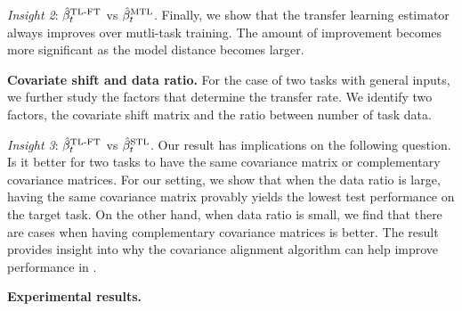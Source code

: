 	{\it Insight 2}: $\hat{\beta}_t^{\text{TL-FT}}$ vs $\hat{\beta}_t^{\text{MTL}}$.
	Finally, we show that the transfer learning estimator always improves over mutli-task training.
	The amount of improvement becomes more significant as the model distance becomes larger.



\smallskip
	\noindent\textbf{Covariate shift and data ratio.}
	For the case of two tasks with general inputs, we further study the factors that determine the transfer rate.
	We identify two factors, the covariate shift matrix and the ratio between number of task data.

	\textit{Insight 3}: $\hat{\beta}_t^{\text{TL-FT}}$ vs $\hat{\beta}_t^{\text{STL}}$.
	Our result has implications on the following question.
	Is it better for two tasks to have the same covariance matrix or complementary covariance matrices.
	For our setting, we show that when the data ratio is large, having the same covariance matrix provably yields the lowest test performance on the target task.
	On the other hand, when data ratio is small, we find that there are cases when having complementary covariance matrices is better.
	The result provides insight into why the covariance alignment algorithm can help improve performance in \cite{WZR20}.

\smallskip
	\noindent\textbf{Experimental results.}


